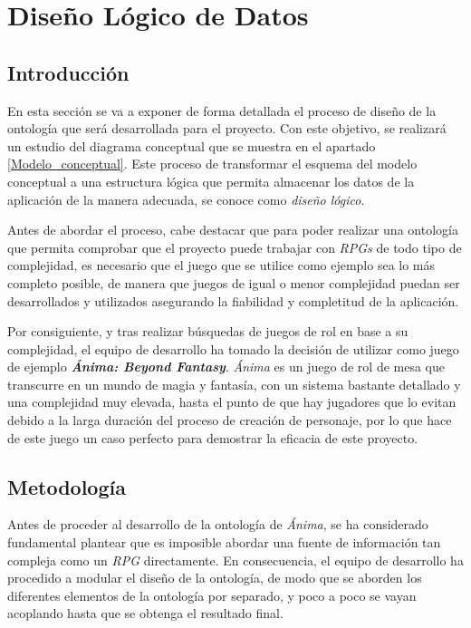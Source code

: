 
\section{Diseño Lógico de Datos}
\subsection{Introducción}
En esta sección se va a exponer de forma detallada el proceso de diseño de la ontología que será desarrollada 
para el proyecto. Con este objetivo, se realizará un estudio del diagrama conceptual 
que se muestra en el apartado \ref{Modelo_conceptual}. Este proceso de transformar el esquema del 
modelo conceptual a una estructura lógica que permita almacenar los datos de la aplicación de la 
manera adecuada, se conoce como \textit{diseño lógico}. \medskip

Antes de abordar el proceso, cabe destacar que para poder realizar una ontología que permita comprobar 
que el proyecto puede trabajar con \textit{RPGs} de todo tipo de complejidad, es necesario que el 
juego que se utilice como ejemplo sea lo más completo posible, de manera que juegos de igual o menor   
complejidad puedan ser desarrollados y utilizados asegurando la fiabilidad y completitud de la aplicación. \medskip

Por consiguiente, y tras realizar búsquedas de juegos de rol en base a su complejidad, el equipo de 
desarrollo ha tomado la decisión de utilizar como juego de ejemplo \textit{\textbf{Ánima: Beyond Fantasy}}.
\textit{Ánima} es un juego de rol de mesa que transcurre en un mundo de magia y fantasía, con un sistema
bastante detallado y una complejidad muy elevada, hasta el punto de que hay jugadores que lo evitan 
debido a la larga duración del proceso de creación de personaje, por lo que hace de este juego un caso 
perfecto para demostrar la eficacia de este proyecto.

\subsection{Metodología}
Antes de proceder al desarrollo de la ontología de \textit{Ánima}, se ha considerado fundamental plantear 
que es imposible abordar una fuente de información tan compleja como un \textit{RPG} directamente. En consecuencia, 
el equipo de desarrollo ha procedido a modular el diseño de la ontología, de modo que se aborden los diferentes 
elementos de la ontología por separado, y poco a poco se vayan acoplando hasta que se obtenga el resultado final. \medskip

